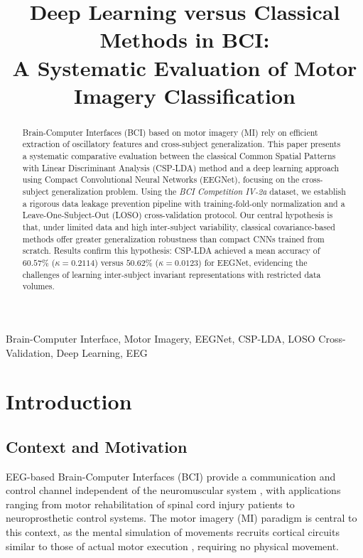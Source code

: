 \documentclass[conference]{IEEEtran}
\title{Deep Learning versus Classical Methods in BCI:\\
A Systematic Evaluation of Motor Imagery Classification}
\author{
\IEEEauthorblockN{Bruno Rocha Guimarães}
\IEEEauthorblockA{\textit{Centro Universitário Jorge Amado (UNIJORGE)}\\
Salvador, BA, Brazil\\
brg.brunorocha@gmail.com}
}
\begin{document}
\maketitle

\begin{abstract}
Brain-Computer Interfaces (BCI) based on motor imagery (MI) rely on efficient extraction of oscillatory features and cross-subject generalization. This paper presents a systematic comparative evaluation between the classical Common Spatial Patterns with Linear Discriminant Analysis (CSP-LDA) method and a deep learning approach using Compact Convolutional Neural Networks (EEGNet), focusing on the cross-subject generalization problem. Using the \textit{BCI Competition IV-2a} dataset, we establish a rigorous data leakage prevention pipeline with training-fold-only normalization and a Leave-One-Subject-Out (LOSO) cross-validation protocol. Our central hypothesis is that, under limited data and high inter-subject variability, classical covariance-based methods offer greater generalization robustness than compact CNNs trained from scratch. Results confirm this hypothesis: CSP-LDA achieved a mean accuracy of $60.57\%$ ($\kappa = 0.2114$) versus $50.62\%$ ($\kappa = 0.0123$) for EEGNet, evidencing the challenges of learning inter-subject invariant representations with restricted data volumes.
\end{abstract}

\begin{IEEEkeywords}
Brain-Computer Interface, Motor Imagery, EEGNet, CSP-LDA, LOSO Cross-Validation, Deep Learning, EEG
\end{IEEEkeywords}

\section{Introduction}

\subsection{Context and Motivation}

EEG-based Brain-Computer Interfaces (BCI) provide a communication and control channel independent of the neuromuscular system \cite{sivakami2015analysis}, with applications ranging from motor rehabilitation of spinal cord injury patients to neuroprosthetic control systems. The motor imagery (MI) paradigm is central to this context, as the mental simulation of movements recruits cortical circuits similar to those of actual motor execution \cite{tsou2025comparison}, requiring no physical movement.
\end{document}
